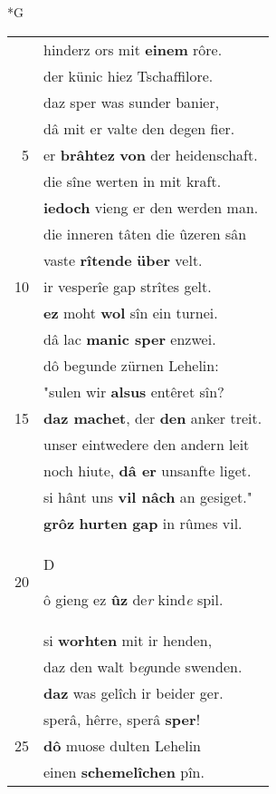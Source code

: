 \documentclass[8pt,a4paper,notitlepage]{article}
\begin{document}
\newpage
\begin{table}[ht]
\begin{minipage}[t]{0.5\linewidth}
\small
\begin{center}*G
\end{center}
\begin{tabular}{rl}
 & hinderz ors mit \textbf{einem} rôre.\\ 
 & der künic hiez Tschaffilore.\\ 
 & daz sper was sunder banier,\\ 
 & dâ mit er valte den degen fier.\\ 
5 & er \textbf{brâhtez} \textbf{von} der heidenschaft.\\ 
 & die sîne werten in mit kraft.\\ 
 & \textbf{iedoch} vieng er den werden man.\\ 
 & die inneren tâten die ûzeren sân\\ 
 & vaste \textbf{rîtende} \textbf{über} velt.\\ 
10 & ir vesperîe gap strîtes gelt.\\ 
 & \textbf{ez} moht \textbf{wol} sîn ein turnei.\\ 
 & dâ lac \textbf{manic sper} enzwei.\\ 
 & dô begunde zürnen Lehelin:\\ 
 & "sulen wir \textbf{alsus} entêret sîn?\\ 
15 & \textbf{daz machet}, der \textbf{den} anker treit.\\ 
 & unser eintwedere den andern leit\\ 
 & noch hiute, \textbf{dâ er} unsanfte liget.\\ 
 & si hânt uns \textbf{vil nâch} an gesiget."\\ 
 & \textbf{grôz} \textbf{hurten} \textbf{gap} in rûmes vil.\\ 
20 & \begin{large}D\end{large}ô gieng ez \textbf{ûz} de\textit{r} kind\textit{e} spil.\\ 
 & si \textbf{worhten} mit ir henden,\\ 
 & daz den walt b\textit{eg}unde swenden.\\ 
 & \textbf{daz} was gelîch ir beider ger.\\ 
 & sperâ, hêrre, sperâ \textbf{sper}!\\ 
25 & \textbf{dô} muose dulten Lehelin\\ 
 & einen \textbf{schemelîchen} pîn.\\ 

\end{tabular}
\end{minipage}
\end{table}
\end{document}
